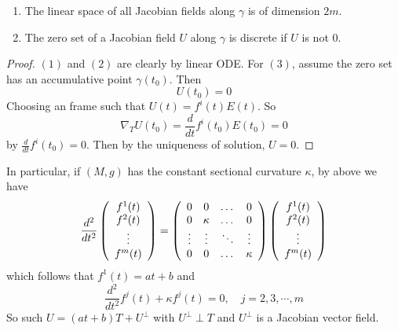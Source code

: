 \begin{enumerate}[label=\arabic{*}.]
\begin{prop}
\begin{enumerate}[label=(\arabic{*})]
			\item The linear space of all Jacobian fields along $\gamma$ is of dimension $2m$.

			\item The zero set of a Jacobian field $U$ along $\gamma$ is discrete if $U$ is not $0$.
		\end{enumerate}
	\end{prop}
	\begin{proof}
		$(1)$ and $(2)$ are clearly by linear ODE. For $(3)$, assume the zero set has an accumulative point $\gamma(t_0)$. Then
		\begin{equation*}
			U(t_0) = 0
		\end{equation*}
		Choosing an frame such that $U(t) = f^i(t)E(t)$. So
		\begin{equation*}
			\nabla_TU(t_0) = \frac{d}{dt}f^i(t_0) E(t_0) = 0
		\end{equation*}
		by $\frac{d}{dt}f^i(t_0) = 0$. Then by the uniqueness of solution, $U = 0$.
	\end{proof}

	\noindent In particular, if $(M,g)$ has the constant sectional curvature $\kappa$, by above we have
	\begin{equation*}
		\frac{d^2}{dt^2}\left(
			\begin{array}{c}
				f^1(t) \\
				f^2(t) \\
				\vdots \\
				f^m(t)
			\end{array}
		\right) = \left(
			\begin{array}{cccc}
				0&0&\dots&0 \\
				0&\kappa&\dots&0 \\
				\vdots & \vdots & \ddots &\vdots \\
				0&0&\dots&\kappa
			\end{array}
		\right)\left(
			\begin{array}{c}
				f^1(t) \\
				f^2(t) \\
				\vdots \\
				f^m(t)
			\end{array}
		\right)
	\end{equation*}
	which follows that $f^1(t) = at+b$ and
	\begin{equation*}
		\frac{d^2}{dt^2}f^j(t) + \kappa f^j(t) = 0,\quad j=2,3,\cdots,m
	\end{equation*}
	So such $U = (at+b)T + U^{\perp}$ with $U^\perp \perp T$ and $U^{\perp}$ is a Jacobian vector field.


\end{enumerate}
